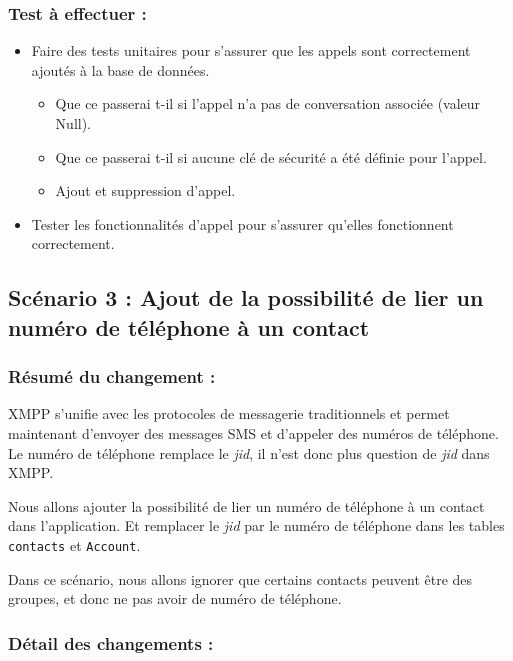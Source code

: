 \documentclass[a4paper,11pt]{article}
\begin{document}
\subsubsection*{Test à effectuer :}

\begin{itemize}
	\item Faire des tests unitaires pour s'assurer que les appels sont correctement ajoutés à la base de données.
	\begin{itemize}
		\item Que ce passerai t-il si l'appel n'a pas de conversation associée (valeur Null).
		\item Que ce passerai t-il si aucune clé de sécurité a été définie pour l'appel.
		\item Ajout et suppression d'appel.
	\end{itemize}
	\item Tester les fonctionnalités d'appel pour s'assurer qu'elles fonctionnent correctement.
\end{itemize}

\subsection*{Scénario 3 : Ajout de la possibilité de lier un numéro de téléphone à un contact}

\subsubsection*{Résumé du changement :}

XMPP s'unifie avec les protocoles de messagerie traditionnels et permet maintenant d'envoyer des messages SMS et d'appeler des numéros de téléphone. Le numéro de téléphone remplace le \textit{jid}, il n'est donc plus question de \textit{jid} dans XMPP.

Nous allons ajouter la possibilité de lier un numéro de téléphone à un contact dans l'application. Et remplacer le \textit{jid} par le numéro de téléphone dans les tables \texttt{contacts} et \texttt{Account}.

Dans ce scénario, nous allons ignorer que certains contacts peuvent être des groupes, et donc ne pas avoir de numéro de téléphone.

\subsubsection*{Détail des changements :}
\end{document}
